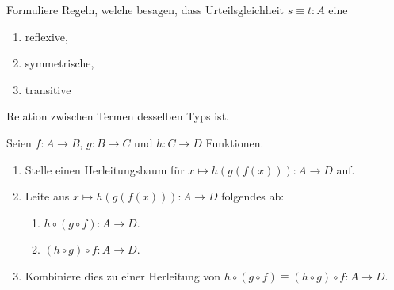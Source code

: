 \documentclass{uebung}
\begin{document}

\begin{exercise}
  Formuliere Regeln, welche besagen, dass Urteilsgleichheit $s\equiv t:A$ eine
  \begin{enumerate}
    \item reflexive,
    \item symmetrische,
    \item transitive
  \end{enumerate}
  Relation zwischen Termen desselben Typs ist.
\end{exercise}

\begin{exercise}
  Seien $f:A\to B$, $g:B\to C$ und $h:C\to D$ Funktionen.
  \begin{enumerate}
    \item Stelle einen Herleitungsbaum für $x\mapsto h(g(f(x))):A\to D$ auf.
    \item Leite aus $x\mapsto h(g(f(x))):A\to D$ folgendes ab:
      \begin{enumerate}
        \item $h\circ (g\circ f):A\to D$.
        \item $(h\circ g)\circ f:A\to D$.
      \end{enumerate}
    \item Kombiniere dies zu einer Herleitung von $h\circ(g\circ f)\equiv (h\circ g)\circ f:A\to D$.
  \end{enumerate}
\end{exercise}
\end{document}

